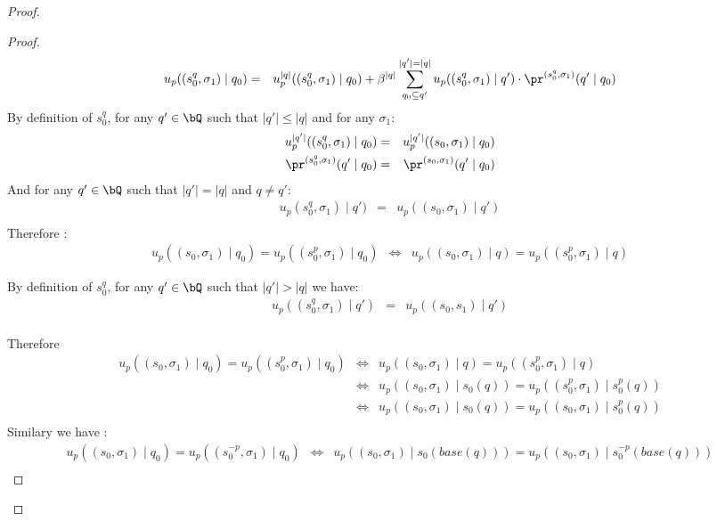 \begin{proof}
\begin{proof}
	\begin{eqnarray*}
		u_p((s^{q}_0,\sigma_1)\mid q_0) & = & u_p^{|q|}((s^{q}_0,\sigma_1)\mid q_0) + \beta^{|q|} \sum_{q_0 \subseteq q'}^{|q'|=|q|} u_p((s^{q}_0,\sigma_1) \mid q') \cdot \pr^{(s^{q}_0,\sigma_1)}(q' \mid q_0) \\
	\end{eqnarray*}
	By definition of $s^{q}_0$, for any $q'\in \bQ$ such that $|q'| \leq |q|$ and for any $\sigma_1$:
	\begin{eqnarray*}
		u_p^{|q'|}((s^{q}_0,\sigma_1) \mid q_0) & = & u_p^{|q'|}((s_0,\sigma_1) \mid q_0) \\ 
		\pr^{(s^{q}_0,\sigma_1)}(q' \mid q_0) & = & \pr^{(s_0,\sigma_1)}(q' \mid q_0)
	\end{eqnarray*}
	And for any $q'\in \bQ$ such that $|q'| = |q|$ and $q \neq q'$:
	\begin{eqnarray*}
		u_p(s^{q}_0,\sigma_1) \mid q') & = & u_p((s_0,\sigma_1) \mid q') \\ 
	\end{eqnarray*}
	Therefore : 
	\begin{eqnarray*}
		u_p((s_0,\sigma_1) \mid q_0) =  u_p((s^p_0,\sigma_1) \mid q_0) & \Leftrightarrow & u_p((s_0,\sigma_1) \mid q) =  u_p((s^p_0,\sigma_1) \mid q)
	\end{eqnarray*}
	
	By definition of $s^{q}_0$, for any $q'\in \bQ$ such that $|q'| > |q|$ we have:
	\begin{eqnarray*}
		u_p((s^{q}_0,\sigma_1) \mid q') & = & u_p((s_0,s_1) \mid q') \\ 
	\end{eqnarray*}
	
	Therefore
	\begin{eqnarray*}
		u_p((s_0,\sigma_1) \mid q_0) =  u_p((s^p_0,\sigma_1) \mid q_0) & \Leftrightarrow & u_p((s_0,\sigma_1) \mid q) =  u_p((s^p_0,\sigma_1) \mid q) \\
		 & \Leftrightarrow &  u_p((s_0,\sigma_1) \mid s_0(q)) = u_p((s^p_0,\sigma_1) \mid s^p_0(q))\\ 
		& \Leftrightarrow & u_p((s_0,\sigma_1) \mid s_0(q)) = u_p((s_0,\sigma_1) \mid s^p_0(q)) \\ 
	\end{eqnarray*}
	Similary we have : 
	\begin{eqnarray*}
		u_p((s_0,\sigma_1) \mid q_0) =  u_p((s^{-p}_0,\sigma_1) \mid q_0) 
		& \Leftrightarrow &  u_p((s_0,\sigma_1) \mid s_0(base(q))) = u_p((s_0,\sigma_1) \mid s^{-p}_0(base(q))) \\ 
	\end{eqnarray*}
\end{proof}



\end{proof}
